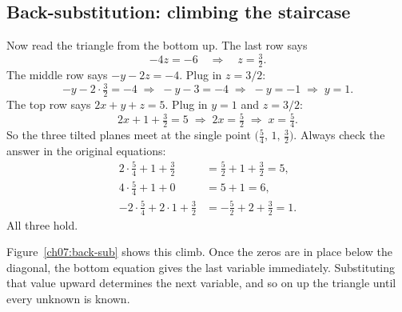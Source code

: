 \subsection{Back-substitution: climbing the staircase}

Now read the triangle from the bottom up. The last row says
\[
-4z = -6 \quad\Longrightarrow\quad z = \tfrac{3}{2}.
\]
The middle row says $-y - 2z = -4$. Plug in $z = 3/2$:
\[
-y - 2\cdot\tfrac{3}{2} = -4 \;\Longrightarrow\; -y - 3 = -4 \;\Longrightarrow\;
-y = -1 \;\Longrightarrow\; y = 1.
\]
The top row says $2x + y + z = 5$. Plug in $y = 1$ and $z = 3/2$:
\[
2x + 1 + \tfrac{3}{2} = 5 \;\Longrightarrow\; 2x = \tfrac{5}{2}
\;\Longrightarrow\; x = \tfrac{5}{4}.
\]
So the three tilted planes meet at the single point
$\bigl(\tfrac54,\,1,\,\tfrac32\bigr)$. Always check the answer in the
original equations:
\begin{align*}
2\cdot\tfrac54 + 1 + \tfrac32 &= \tfrac52 + 1 + \tfrac32 = 5, \\
4\cdot\tfrac54 + 1 + 0 &= 5 + 1 = 6, \\
-2\cdot\tfrac54 + 2\cdot 1 + \tfrac32 &= -\tfrac52 + 2 + \tfrac32 = 1.
\end{align*}
All three hold.

Figure~\ref{ch07:back-sub} shows this climb. Once the zeros
are in place below the diagonal, the bottom equation gives the last
variable immediately. Substituting that value upward determines the next variable, and so
on up the triangle until every unknown is known.

